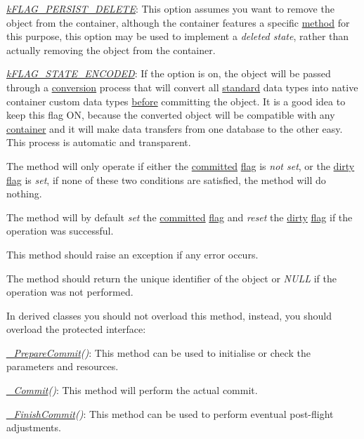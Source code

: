 \begin{DoxyItemize}
\begin{DoxyItemize}
\item {\itshape \hyperlink{}{k\-F\-L\-A\-G\-\_\-\-P\-E\-R\-S\-I\-S\-T\-\_\-\-D\-E\-L\-E\-T\-E}}\-: This option assumes you want to remove the object from the container, although the container features a specific \hyperlink{class_c_container_aa91ec2f4624a2ebfb74668f274139329}{method} for this purpose, this option may be used to implement a {\itshape deleted state}, rather than actually removing the object from the container. 
\item {\itshape \hyperlink{}{k\-F\-L\-A\-G\-\_\-\-S\-T\-A\-T\-E\-\_\-\-E\-N\-C\-O\-D\-E\-D}}\-: If the option is on, the object will be passed through a \hyperlink{class_c_container_aa339d3c4c9b011713176a89fe9c7783d}{conversion} process that will convert all \hyperlink{class_c_data_type}{standard} data types into native container custom data types \hyperlink{class_c_container_a0dc47e54abc533cedf1c2c0f915d96b2}{before} committing the object. It is a good idea to keep this flag O\-N, because the converted object will be compatible with any \hyperlink{class_c_container}{container} and it will make data transfers from one database to the other easy. This process is automatic and transparent. 
\end{DoxyItemize}
\end{DoxyItemize}

The method will only operate if either the \hyperlink{class_c_persistent_object_a6520a7bcecf3f39fd61ec6d08f736e77}{committed} \hyperlink{}{flag} is {\itshape not set}, or the \hyperlink{class_c_status_object_a19c4ac94dfe26476e780d77b99744d43}{dirty} \hyperlink{}{flag} is {\itshape set}, if none of these two conditions are satisfied, the method will do nothing.

The method will by default {\itshape set} the \hyperlink{class_c_persistent_object_a6520a7bcecf3f39fd61ec6d08f736e77}{committed} \hyperlink{}{flag} and {\itshape reset} the \hyperlink{class_c_status_object_a19c4ac94dfe26476e780d77b99744d43}{dirty} \hyperlink{}{flag} if the operation was successful.

This method should raise an exception if any error occurs.

The method should return the unique identifier of the object or {\itshape N\-U\-L\-L} if the operation was not performed.

In derived classes you should not overload this method, instead, you should overload the protected interface\-:


\begin{DoxyItemize}
\item {\itshape \hyperlink{class_c_persistent_object_a9d98503112f78729b13995a850b174a8}{\-\_\-\-Prepare\-Commit}()}\-: This method can be used to initialise or check the parameters and resources. 
\item {\itshape \hyperlink{class_c_persistent_object_ad5376e5aeda7a58e5b27fae6c03b4ef9}{\-\_\-\-Commit}()}\-: This method will perform the actual commit. 
\item {\itshape \hyperlink{class_c_persistent_object_a535a2f078b777a144d31117de054ccf7}{\-\_\-\-Finish\-Commit}()}\-: This method can be used to perform eventual post-\/flight adjustments. 
\end{DoxyItemize}


